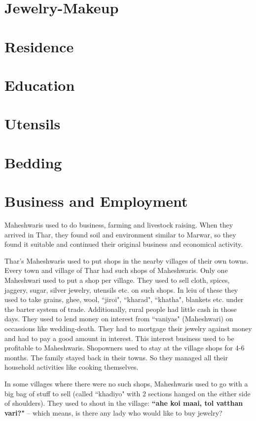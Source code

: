 \section{Jewelry-Makeup}
\section{Residence}
\section{Education}
\section{Utensils}
\section{Bedding}
\section{Business and Employment}
Maheshwaris used to do business, farming and livestock raising. When they arrived in Thar, they found soil and environment similar to Marwar, so they found it suitable and continued their original business and economical activity.

Thar's Maheshwaris used to put shops in the nearby villages of their own towns. Every town and village of Thar had such shops of Maheshwaris. Only one Maheshwari used to put a shop per village. They used to sell cloth, spices, jaggery, sugar, silver jewelry, utensils etc. on such shops. In leiu of these they used to take grains, ghee, wool, ``jiroi", ``kharad", ``khatha", blankets etc. under the barter system of trade. Additionally, rural people had little cash in those days. They used to lend money on interest from ``vaniyas" (Maheshwari) on occassions like wedding-death. They had to mortgage their jewelry against money and had to pay a good amount in interest. This interest business used to be profitable to Maheshwaris. Shopowners used to stay at the village shops for 4-6 months. The family stayed back in their towns. So they managed all their household activities like cooking themselves.

In some villages where there were no such shops, Maheshwaris used to go with a big bag of stuff to sell (called ``khadiyo" with 2 sections hanged on the either side of shoulders). They used to shout in the village: \textbf{``ahe koi maai, tol vatthan vari?"} -- which means, is there any lady who would like to buy jewelry?


